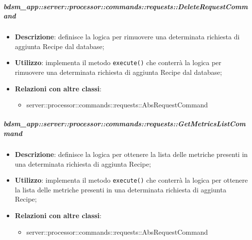         \subparagraph{bdsm\_app::server::processor::commands::requests::DeleteRequestCommand} %
        \label{subp:bdsm_app_server_processor_commands_requests_deleterequestcommand}
        \begin{itemize}
          \item \textbf{Descrizione}: definisce la logica per rimuovere una determinata richiesta di aggiunta Recipe dal database;
          \item \textbf{Utilizzo}: implementa il metodo \texttt{execute()} che conterrà la logica per rimuovere una determinata richiesta di aggiunta Recipe dal database;
          \item \textbf{Relazioni con altre classi}:
            \begin{itemize}
              \item server::processor::commands::requests::AbsRequestCommand
            \end{itemize}
        \end{itemize}

        \subparagraph{bdsm\_app::server::processor::commands::requests::GetMetricsListCommand} %
        \label{subp:bdsm_app_server_processor_commands_requests_getmetricslistcommand}
        \begin{itemize}
          \item \textbf{Descrizione}: definisce la logica per ottenere la lista delle metriche presenti in una determinata richiesta di aggiunta Recipe;
          \item \textbf{Utilizzo}: implementa il metodo \texttt{execute()} che conterrà la logica per ottenere la lista delle metriche presenti in una determinata richiesta di aggiunta Recipe;
          \item \textbf{Relazioni con altre classi}:
            \begin{itemize}
              \item server::processor::commands::requests::AbsRequestCommand
            \end{itemize}
        \end{itemize}

